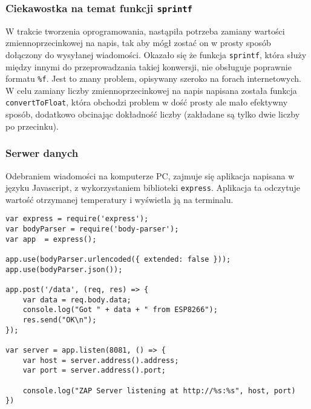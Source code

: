 \subsubsection{Ciekawostka na temat funkcji \texttt{sprintf}}
W trakcie tworzenia oprogramowania, nastąpiła potrzeba zamiany wartości zmiennoprzecinkowej
na napis, tak aby mógł zostać on w prosty sposób dołączony do wysyłanej wiadomości.
Okazało się że funkcja \verb+sprintf+, która służy między innymi do przeprowadzania takiej
konwersji, nie obsługuje poprawnie formatu \verb+%f+. Jest to znany problem, opisywany
szeroko na forach internetowych. W celu zamiany liczby zmiennoprzecinkowej na napis
napisana została funkcja \verb+convertToFloat+, która obchodzi problem w dość prosty
ale mało efektywny sposób, dodatkowo obcinając dokładność liczby (zakładane są tylko 
dwie liczby po przecinku).\\

\subsubsection{Serwer danych}
Odebraniem wiadomości na komputerze PC, zajmuje się aplikacja napisana w języku 
Javascript, z wykorzystaniem biblioteki \verb+express+. Aplikacja ta odczytuje 
wartość otrzymanej temperatury i wyświetla ją na terminalu.

\begin{lstlisting}[style=customjs,
  frame=single,
  caption={Prosta aplikacja do zbierania danych z czujnika},
  captionpos=b,
  label={projekt_adc_task}]
var express = require('express');
var bodyParser = require('body-parser');
var app  = express();

app.use(bodyParser.urlencoded({ extended: false }));
app.use(bodyParser.json());

app.post('/data', (req, res) => {
    var data = req.body.data;
    console.log("Got " + data + " from ESP8266");
    res.send("OK\n");
});

var server = app.listen(8081, () => {
    var host = server.address().address;
    var port = server.address().port;

    console.log("ZAP Server listening at http://%s:%s", host, port)
})

\end{lstlisting}
